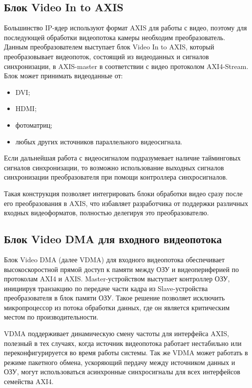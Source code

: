 \subsection{Блок Video In to AXIS}
\label{sec:structural:video_in_to_axis}
Большинство IP-ядер используют формат AXIS для работы с видео, поэтому для последующей обработки
видеопотока камеры необходим преобразователь. Данным преобразователем выступает блок Video In to AXIS,
который преобразовывает видеопоток, состоящий из видеоданных и сигналов синхронизации, в
AXIS-master в соответствии с видео протоколом AXI4-Stream. Блок может принимать
видеоданные от:
\begin{itemize}
  \item DVI;
  \item HDMI;
  \item фотоматриц;
  \item любых других источников параллельного видеосигнала.
\end{itemize}

Если дальнейшая работа с видеосигналом подразумевает наличие тайминговых сигналов синхронизации,
то возможно использование выходных сигналов синхронизации преобразователя при помощи контроллера
синхросигналов.

Такая конструкция позволяет интегрировать блоки обработки видео сразу после его преобразования в AXIS,
что избавляет разработчика от поддержки различных входных видеоформатов, полностью делегируя это преобразователю.

\subsection{Блок Video DMA для входного видеопотока}
\label{sec:structural:vdma_in}
Блок Video DMA (далее VDMA) для входного видеопотока обеспечивает высокоскоростной прямой доступ к памяти
между ОЗУ и видеопериферией по протоколам AXI4 и AXIS. Master-устройством выступает контроллер ОЗУ,
инициируя транзакцию по передаче части кадра из Slave-устройства преобразователя в блок памяти ОЗУ.
Такое решение позволяет исключить микропроцессор из потока обработки данных, где он является
критическим местом по производительности.

VDMA поддерживает динамическую смену частоты для интерфейса AXIS, полезный в тех случаях,
когда источник видеопотока работает нестабильно или переконфигурируется во время работы системы.
Так же VDMA может работать в режиме пакетного обмена, ускоряющий пердачу между источником данных и ОЗУ,
могут использоваться асинхронные синхросигналы для всех интерфейсов семейства AXI4.

